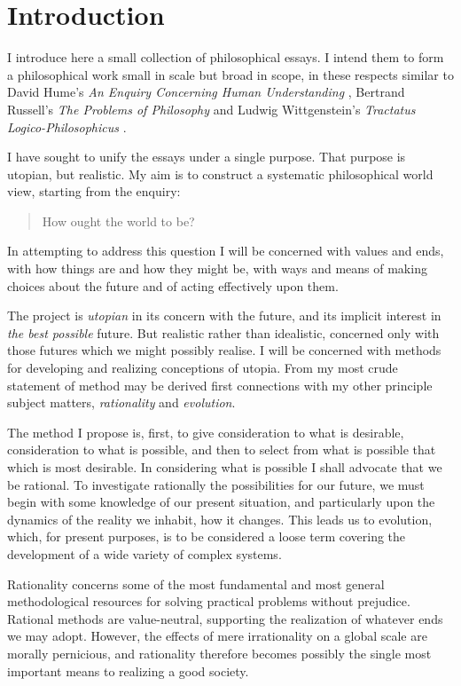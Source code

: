 \chapter{Introduction}\label{Introduction}

I introduce here a small collection of philosophical essays.
I intend them to form a philosophical work small in scale but broad in scope, in these respects similar to David Hume's {\it An Enquiry Concerning Human Understanding} \cite{humeECHU}, Bertrand Russell's {\it The Problems of Philosophy} \cite{russellPP} and Ludwig Wittgenstein's {\it Tractatus Logico-Philosophicus} \cite{wittgenstein1921}.

I have sought to unify the essays under a single purpose.
That purpose is utopian, but realistic.
My aim is to construct a systematic philosophical world view, starting from the enquiry:

\begin{quote}\label{Q1}
How ought the world to be?
\end{quote}

In attempting to address this question I will be concerned with values and ends, with how things are and how they might be, with ways and means of making choices about the future and of acting effectively upon them.

The project is {\it utopian} in its concern with the future, and its implicit interest in {\it the best possible} future.
But realistic rather than idealistic, concerned only with those futures which we might possibly realise.
I will be concerned with methods for developing and realizing conceptions of utopia.
From my most crude statement of method may be derived first connections with my other principle subject matters, {\it rationality} and {\it evolution}.

The method I propose is, first, to give consideration to what is desirable, consideration to what is possible, and then to select from what is possible that which is most desirable.
In considering what is possible I shall advocate that we be rational.
To investigate rationally the possibilities for our future, we must begin with some knowledge of our present situation, and particularly upon the dynamics of the reality we inhabit, how it changes.
This leads us to evolution, which, for present purposes, is to be considered a loose term covering the development of a wide variety of complex systems.

Rationality concerns some of the most fundamental and most general methodological resources for solving practical problems without prejudice.
Rational methods are value-neutral, supporting the realization of whatever ends we may adopt.
However, the effects of mere irrationality on a global scale are morally pernicious, and rationality therefore becomes possibly the single most important means to realizing a good society.

